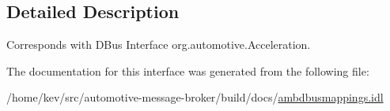 \subsection{Detailed Description}
Corresponds with D\+Bus Interface org.\+automotive.\+Acceleration. 

The documentation for this interface was generated from the following file\+:\begin{DoxyCompactItemize}
\item 
/home/kev/src/automotive-\/message-\/broker/build/docs/\hyperlink{ambdbusmappings_8idl}{ambdbusmappings.\+idl}\end{DoxyCompactItemize}
